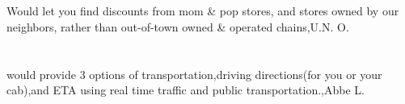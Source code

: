 \section{}Would let you find discounts from mom \& pop stores, and stores owned by our neighbors, rather than out-of-town owned \& operated chains,U.N. O.	
\section{}would provide 3 options of transportation,driving directions(for you or your cab),and ETA using real time traffic and public transportation.,Abbe L.	
